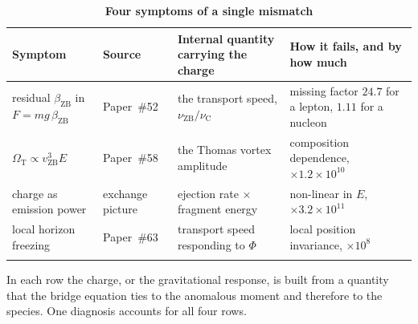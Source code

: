 \documentclass[%
 reprint, amsmath,amssymb, aps, prb, ]{revtex4-2}
\numberwithin{equation}{section}
\newcommand{\vZB}{v_{\text{ZB}}}
\newcommand{\betaZB}{\beta_{\text{ZB}}}
\newcommand{\nuZB}{\nu_{\text{ZB}}}
\newcommand{\nuC}{\nu_{\text{C}}}
\newcommand{\OmT}{\Omega_{\text{T}}}
\begin{document}
\begin{table}[t!]
\centering
\caption{\textbf{Four symptoms of a single mismatch}}
\label{tab:diagnosis}
\renewcommand{\arraystretch}{1.4}
\setlength{\tabcolsep}{7pt}
\begin{tabular}{>{\raggedright\arraybackslash}p{3.9cm}>{\raggedright\arraybackslash}p{2.3cm}>{\raggedright\arraybackslash}p{4.3cm}>{\raggedright\arraybackslash}p{4.0cm}}
\toprule
\textbf{Symptom} & \textbf{Source} & \textbf{Internal quantity carrying the charge} & \textbf{How it fails, and by how much} \\
\midrule
residual $\betaZB$ in $F = mg\,\betaZB$ & Paper~\#52 & the transport speed, $\nuZB/\nuC$ & missing factor $24.7$ for a lepton, $1.11$ for a nucleon \\
\addlinespace[0.3cm]
$\OmT \propto \vZB^{3}E$ & Paper~\#58 & the Thomas vortex amplitude & composition dependence, $\times1.2\times10^{10}$ \\
\addlinespace[0.3cm]
charge as emission power & exchange picture & ejection rate $\times$ fragment energy & non-linear in $E$, $\times3.2\times10^{11}$ \\
\addlinespace[0.3cm]
local horizon freezing & Paper~\#63 & transport speed responding to $\Phi$ & local position invariance, $\times10^{8}$ \\
\addlinespace[0.2cm]
\bottomrule
\end{tabular}
\vspace{0.2cm}
\begin{minipage}{0.95\textwidth}
\justifying\footnotesize
In each row the charge, or the gravitational response, is built from a quantity that the bridge equation ties to the anomalous moment and therefore to the species. One diagnosis accounts for all four rows.
\end{minipage}
\end{table}
\end{document}
